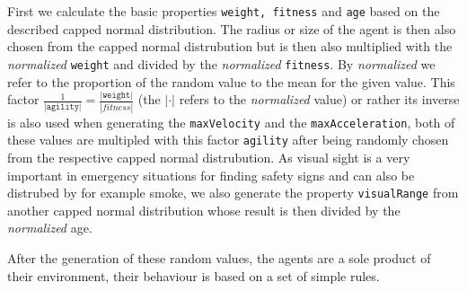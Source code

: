 \documentclass[11pt]{article}
\begin{document}
First we calculate the basic properties \texttt{weight, fitness} and \texttt{age} based on the described capped normal distribution. The radius or size of the agent is then also chosen from the capped normal distrubution but is then also multiplied with the \textit{normalized} \texttt{weight} and divided by the \textit{normalized} \texttt{fitness}. By \textit{normalized} we refer to the proportion of the random value to the mean for the given value. This factor $\frac{1}{\texttt{|agility|}} = \frac{\texttt{|weight|}}{|fitness|}$ (the $|\cdot|$ refers to the \textit{normalized} value) or rather its inverse is also used when generating the \texttt{maxVelocity} and the \texttt{maxAcceleration}, both of these values are multipled with this factor \texttt{agility} after being randomly chosen from the respective capped normal distrubution. As visual sight is a very important in emergency situations for finding safety signs and can also be distrubed by for example smoke, we also generate the property \texttt{visualRange} from another capped normal distribution whose result is then divided by the \textit{normalized} age.

After the generation of these random values, the agents are a sole product of their environment, their behaviour is based on a set of simple rules.
\end{document}
